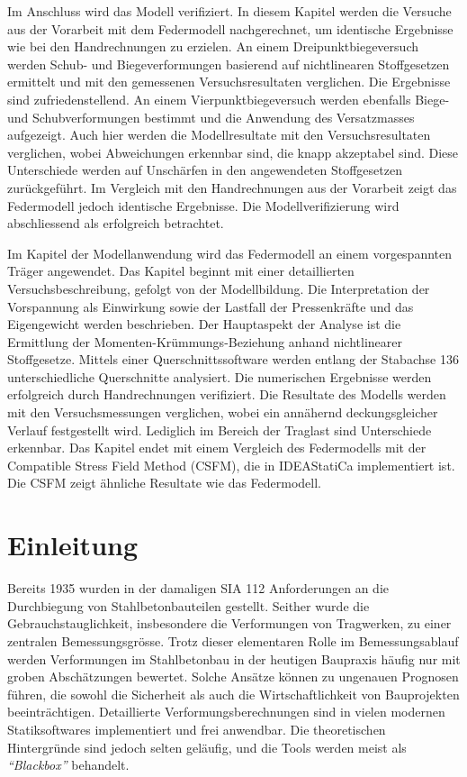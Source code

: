 \documentclass[
  11pt,
  letterpaper,
]{scrreprt}
\renewcommand*\contentsname{Inhaltsverzeichnis}
\newcommand\contentsname{Inhaltsverzeichnis}
\begin{document}
Im Anschluss wird das Modell verifiziert. In diesem Kapitel werden die Versuche aus der Vorarbeit mit dem Federmodell nachgerechnet, um identische Ergebnisse wie bei den Handrechnungen zu erzielen. An einem Dreipunktbiegeversuch werden Schub- und Biegeverformungen basierend auf nichtlinearen Stoffgesetzen ermittelt und mit den gemessenen Versuchsresultaten verglichen. Die Ergebnisse sind zufriedenstellend. An einem Vierpunktbiegeversuch werden ebenfalls Biege- und Schubverformungen bestimmt und die Anwendung des Versatzmasses aufgezeigt. Auch hier werden die Modellresultate mit den Versuchsresultaten verglichen, wobei Abweichungen erkennbar sind, die knapp akzeptabel sind. Diese Unterschiede werden auf Unschärfen in den angewendeten Stoffgesetzen zurückgeführt. Im Vergleich mit den Handrechnungen aus der Vorarbeit zeigt das Federmodell jedoch identische Ergebnisse. Die Modellverifizierung wird abschliessend als erfolgreich betrachtet.

Im Kapitel der Modellanwendung wird das Federmodell an einem vorgespannten Träger angewendet. Das Kapitel beginnt mit einer detaillierten Versuchsbeschreibung, gefolgt von der Modellbildung. Die Interpretation der Vorspannung als Einwirkung sowie der Lastfall der Pressenkräfte und das Eigengewicht werden beschrieben. Der Hauptaspekt der Analyse ist die Ermittlung der Momenten-Krümmungs-Beziehung anhand nichtlinearer Stoffgesetze. Mittels einer Querschnittssoftware werden entlang der Stabachse 136 unterschiedliche Querschnitte analysiert. Die numerischen Ergebnisse werden erfolgreich durch Handrechnungen verifiziert. Die Resultate des Modells werden mit den Versuchsmessungen verglichen, wobei ein annähernd deckungsgleicher Verlauf festgestellt wird. Lediglich im Bereich der Traglast sind Unterschiede erkennbar. Das Kapitel endet mit einem Vergleich des Federmodells mit der Compatible Stress Field Method (CSFM), die in IDEAStatiCa implementiert ist. Die CSFM zeigt ähnliche Resultate wie das Federmodell.

\renewcommand*\contentsname{Inhaltsverzeichnis}
{
\hypersetup{linkcolor=}
\setcounter{tocdepth}{1}
\tableofcontents
}
\listoffigures
{}

\chapter{Einleitung}\label{einleitung}

Bereits 1935 wurden in der damaligen SIA 112 Anforderungen an die
Durchbiegung von Stahlbetonbauteilen gestellt. Seither wurde die
Gebrauchstauglichkeit, insbesondere die Verformungen von Tragwerken, zu
einer zentralen Bemessungsgrösse. Trotz dieser elementaren Rolle im
Bemessungsablauf werden Verformungen im Stahlbetonbau in der heutigen
Baupraxis häufig nur mit groben Abschätzungen bewertet. Solche Ansätze
können zu ungenauen Prognosen führen, die sowohl die Sicherheit als auch
die Wirtschaftlichkeit von Bauprojekten beeinträchtigen. Detaillierte
Verformungsberechnungen sind in vielen modernen Statiksoftwares
implementiert und frei anwendbar. Die theoretischen Hintergründe sind
jedoch selten geläufig, und die Tools werden meist als
\emph{``Blackbox''} behandelt.
\end{document}
